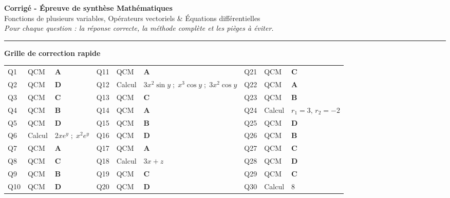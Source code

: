 \documentclass[11pt,a4paper]{article}
\begin{document}
\begin{center}
  {\Large\bfseries\color{bleutexte} Corrigé - Épreuve de synthèse Mathématiques}\\[4pt]
  {\large Fonctions de plusieurs variables, Opérateurs vectoriels \& Équations différentielles}\\[6pt]
  {\small\itshape
    Pour chaque question : la réponse correcte, la méthode complète et les pièges à éviter.}
\end{center}

\vspace{2pt}
\noindent\rule{\linewidth}{0.6pt}
\vspace{4pt}

\begin{notebox}
\textbf{Grille de correction rapide}\\[4pt]
\begin{tabular}{@{}lll@{\quad}lll@{\quad}lll@{}}
Q1  & QCM    & \textbf{A}                             &
Q11 & QCM    & \textbf{A}                             &
Q21 & QCM    & \textbf{C}                             \\
Q2  & QCM    & \textbf{D}                             &
Q12 & Calcul & $3x^2\sin y\;;\;x^3\cos y\;;\;3x^2\cos y$ &
Q22 & QCM    & \textbf{A}                             \\
Q3  & QCM    & \textbf{C}                             &
Q13 & QCM    & \textbf{C}                             &
Q23 & QCM    & \textbf{B}                             \\
Q4  & QCM    & \textbf{B}                             &
Q14 & QCM    & \textbf{A}                             &
Q24 & Calcul & $r_1=3,\,r_2=-2$                       \\
Q5  & QCM    & \textbf{D}                             &
Q15 & QCM    & \textbf{B}                             &
Q25 & QCM    & \textbf{D}                             \\
Q6  & Calcul & $2xe^y\;;\;x^2e^y$                     &
Q16 & QCM    & \textbf{D}                             &
Q26 & QCM    & \textbf{B}                             \\
Q7  & QCM    & \textbf{A}                             &
Q17 & QCM    & \textbf{A}                             &
Q27 & QCM    & \textbf{C}                             \\
Q8  & QCM    & \textbf{C}                             &
Q18 & Calcul & $3x+z$                                 &
Q28 & QCM    & \textbf{D}                             \\
Q9  & QCM    & \textbf{B}                             &
Q19 & QCM    & \textbf{C}                             &
Q29 & QCM    & \textbf{C}                             \\
Q10 & QCM    & \textbf{D}                             &
Q20 & QCM    & \textbf{D}                             &
Q30 & Calcul & $8$                                    \\
\end{tabular}
\end{notebox}
\end{document}
